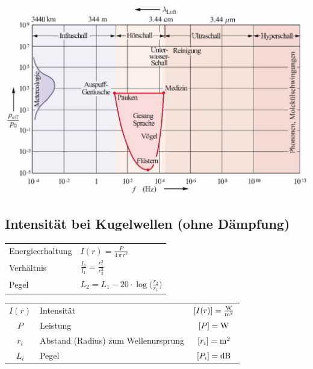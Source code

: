 \includegraphics[width=0.9\linewidth]{Bilder/Wellen-Optik/schallquellen} \\




\subsection{Intensität bei Kugelwellen (ohne Dämpfung)}

\begin{tabular}{ll}
Energieerhaltung & $ \boxed{ I(r) = \frac{P}{4 \, \pi \, r^2} }$ \\

Verhältnis & $\boxed{ \frac{I_2}{I_1} = \frac{r_1^2}{r_2^2} }$ \\

Pegel & $\boxed{ L_2 = L_1 - 20 \cdot \log \Big( \frac{r_2}{r_1} \Big)}$ \\
\end{tabular}


\begin{tabular}{clc}
$I(r)$ & Intensität & $[I(r)] = \frac{\mathrm{W}}{\mathrm{m}^2}$ \\
$P$ & Leistung & $[P] = \mathrm{W}$ \\
$r_i$ & Abstand (Radius) zum Wellenursprung & $[r_i] = \mathrm{m}^2$\\
$L_i$ & Pegel & $[P_i] = \mathrm{dB}$ 
\end{tabular}



